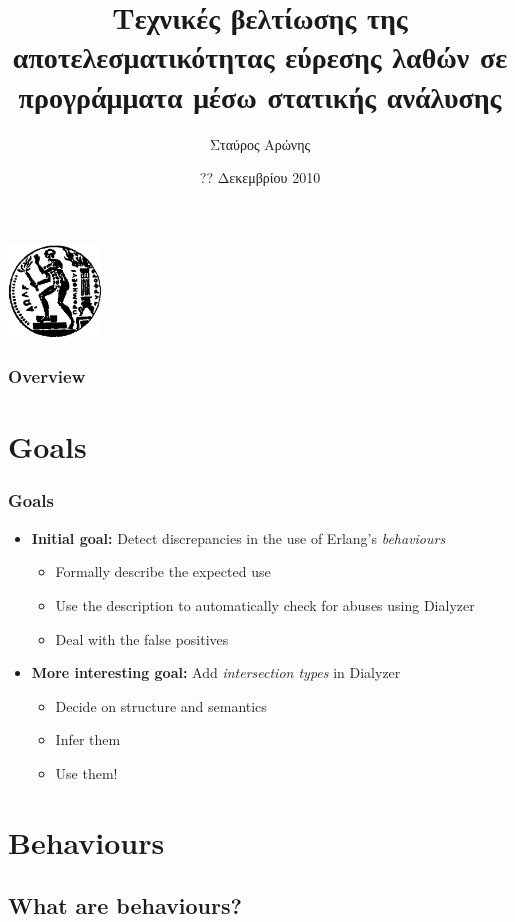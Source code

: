 \documentclass{beamer}
\title{Τεχνικές βελτίωσης της αποτελεσματικότητας εύρεσης λαθών
       σε προγράμματα μέσω στατικής ανάλυσης}
\author{Σταύρος Αρώνης}
\date{?? Δεκεμβρίου 2010}
\institute{Διπλωματική εργασία\\Σχολή ΗΜΜΥ, ΕΜΠ}
\begin{document}
\begin{frame}
	\titlepage
	\begin{center}
		\includegraphics[width=2.5cm]{pyrforos}
	\end{center}
\end{frame}

\begin{frame}
	\frametitle{Overview}
	\tableofcontents[hidesubsections]
\end{frame}

\section{Goals}

\begin{frame}
	\frametitle{Goals}
	\begin{itemize}
		\item \textbf{Initial goal:} Detect discrepancies
		in the use of Erlang's \emph{behaviours}
		\pause
		\begin{itemize}
			\item Formally describe the expected use
			\pause
			\item Use the description to automatically
			check for abuses using Dialyzer
			\pause
			\item Deal with the false positives
		\end{itemize}
		\pause
		\item \textbf{More interesting goal:} Add
		\emph{intersection types} in Dialyzer
		\pause
		\begin{itemize}
			\item Decide on structure and semantics
			\pause
			\item Infer them
			\pause
			\item Use them!
		\end{itemize}
	\end{itemize}
\end{frame}

\section{Behaviours}

\subsection{What are behaviours?}
\end{document}
